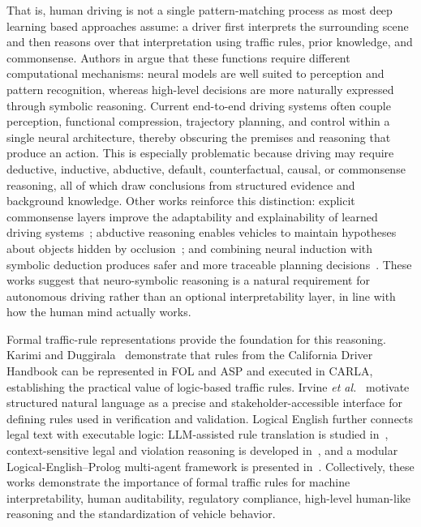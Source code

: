\documentclass[10pt, conference, letterpaper]{ IEEEtran}
\theoremstyle{bfnote}
\begin{document}
That is, human driving is not a single pattern-matching process as most deep learning based approaches assume: a driver first interprets the surrounding scene and then reasons over that interpretation using traffic rules, prior knowledge, and commonsense. Authors in \cite{Kothawade2021AUTODISCERNAD} argue that these functions require different computational mechanisms: neural models are well suited to perception and pattern recognition, whereas high-level decisions are more naturally expressed through symbolic reasoning. Current end-to-end driving systems often couple perception, functional compression, trajectory planning, and control within a single neural architecture, thereby obscuring the premises and reasoning that produce an action. This is especially problematic because driving may require deductive, inductive, abductive, default, counterfactual, causal, or commonsense reasoning, all of which draw conclusions from structured evidence and background knowledge. Other works reinforce this distinction: explicit commonsense layers improve the adaptability and explainability of learned driving systems~\cite{Kimbrell2025CommonsenseRA}; abductive reasoning enables vehicles to maintain hypotheses about objects hidden by occlusion~\cite{Suchan2019OutOS}; and combining neural induction with symbolic deduction produces safer and more traceable planning decisions~\cite{Wei2026ANF}. These works suggest that neuro-symbolic reasoning is a natural requirement for autonomous driving rather than an optional interpretability layer, in line with how the human mind actually works.

Formal traffic-rule representations provide the foundation for this reasoning. Karimi and Duggirala~\cite{Karimi2020FormalizingTR} demonstrate that rules from the California Driver Handbook can be represented in FOL and ASP and executed in CARLA, establishing the practical value of logic-based traffic rules. Irvine \emph{et al.}~\cite{Irvine2023StructuredNL} motivate structured natural language as a precise and stakeholder-accessible interface for defining rules used in verification and validation. Logical English further connects legal text with executable logic: LLM-assisted rule translation is studied in~\cite{DalPont2025YouTT}, context-sensitive legal and violation reasoning is developed in~\cite{Sartor2025ALL}, and a modular Logical-English--Prolog multi-agent framework is presented in~\cite{Sartor2025MindTG}. Collectively, these works demonstrate the importance of formal traffic rules for machine interpretability, human auditability, regulatory compliance, high-level human-like reasoning and the standardization of vehicle behavior.
\end{document}
